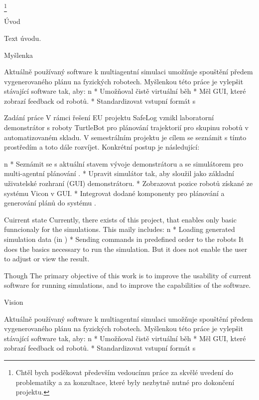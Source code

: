\thanks {Chtěl bych poděkovat především vedoucímu práce \kulich za skvělé uvedení do problematiky a za konzultace, které byly nezbytně nutné pro dokončení projektu.}
\makefront



\chap Úvod


Text úvodu.

\sec Myšlenka

Aktuálně používaný software k multiagentní simulaci umožňuje spouštění předem vygenerovaného plánu na fyzických robotech. Myšlenkou této práce je vylepšit stávající software tak, aby:
\begitems \style n
    * Umožňoval čistě virtuální běh
    * Měl GUI, které zobrazí feedback od robotů.
    * Standardizovat vstupní formát s \mapfIR
\enditems

\sec Zadání práce
V rámci řešení EU projektu SafeLog vznikl laboratorní demonstrátor s roboty TurtleBot pro plánování trajektorií pro skupinu robotů v automatizovaném skladu. V semestrálním projektu je cílem se seznámit s tímto prostředím a toto dále rozvíjet. Konkrétní postup je následující:


\begitems \style n
    * Seznámit se s aktuální stavem vývoje demonstrátoru a se simulátorem pro multi-agentní plánování \mapfIR.
    * Upravit simulátor tak, aby sloužil jako základní uživatelské rozhraní (GUI) demonstrátoru.
    * Zobrazovat pozice robotů získané ze systému Vicon v GUI.
    * Integrovat dodané komponenty pro plánování a generování plánů do systému .
\enditems

\sec Cuirrent state
Currently, there exists {\oldRepo} of this project, that enables only basic funncionaly for the simulations. This maily includes:
\begitems \style n
    * Loading generated simulation data (in {\oldFormat})
    * Sending commands in predefined order to the robots
\enditems
It does the basics necessary to run the simulation. But it does not enable the user to adjust or view the result.

\sec Though
The primary objective of this work is to improve the usability of current software for running simulations, and to improve the capabilities of the software.

\sec Vision

Aktuálně používaný software k multiagentní simulaci umožňuje spouštění předem vygenerovaného plánu na fyzických robotech. Myšlenkou této práce je vylepšit stávající software tak, aby:
\begitems \style n
    * Umožňoval čistě virtuální běh
    * Měl GUI, které zobrazí feedback od robotů.
    * Standardizovat vstupní formát s \mapfIR
\enditems




\bye
\endtt
